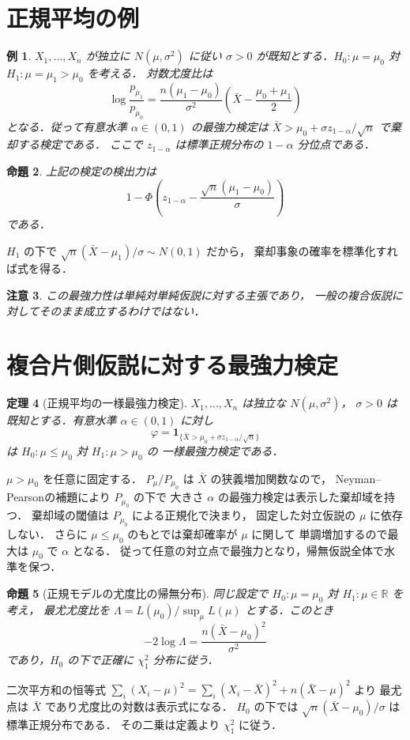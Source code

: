 \documentclass[a5paper,10pt,onecolumn]{jsarticle}
\makeatletter
\theoremstyle{mathnotetheorem}
\newtheorem{theorem}{定理}[section]
\newtheorem{proposition}[theorem]{命題}
\newtheorem{example}[theorem]{例}
\newtheorem{remark}[theorem]{注意}
\renewcommand{\proofname}{証明}
\renewenvironment{proof}[1][\proofname]{%
  \par\pushQED{\qed}\normalfont\topsep4\p@\@plus2\p@\relax
  \trivlist\item[\hskip\labelsep\bfseries #1]\ignorespaces
}{\popQED\endtrivlist\@endpefalse}
\makeatother
\begin{document}
\section{正規平均の例}
\begin{example}
$X_1,\ldots,X_n$ が独立に $N(\mu,\sigma^2)$ に従い
$\sigma>0$ が既知とする．$H_0:\mu=\mu_0$ 対
$H_1:\mu=\mu_1>\mu_0$ を考える．
対数尤度比は
\[
 \log\frac{p_{\mu_1}}{p_{\mu_0}}
 =\frac{n(\mu_1-\mu_0)}{\sigma^2}
  \left(\bar X-\frac{\mu_0+\mu_1}{2}\right)
\]
となる．従って有意水準 $\alpha\in(0,1)$ の最強力検定は
$\bar X>\mu_0+\sigma z_{1-\alpha}/\sqrt n$ で棄却する検定である．
ここで $z_{1-\alpha}$ は標準正規分布の $1-\alpha$ 分位点である．
\end{example}
\begin{proposition}
上記の検定の検出力は
\[
 1-\Phi\!\left(z_{1-\alpha}-\frac{\sqrt n(\mu_1-\mu_0)}{\sigma}\right)
\]
である．
\end{proposition}
\begin{proof}
$H_1$ の下で $\sqrt n(\bar X-\mu_1)/\sigma\sim N(0,1)$ だから，
棄却事象の確率を標準化すれば式を得る．
\end{proof}
\begin{remark}
この最強力性は単純対単純仮説に対する主張であり，
一般の複合仮説に対してそのまま成立するわけではない．
\end{remark}


\section{複合片側仮説に対する最強力検定}
\begin{theorem}[正規平均の一様最強力検定]
$X_1,\ldots,X_n$ は独立な $N(\mu,\sigma^2)$，
$\sigma>0$ は既知とする．有意水準 $\alpha\in(0,1)$ に対し
\[
 \varphi=\mathbf1_{\{\bar X>\mu_0+\sigma z_{1-\alpha}/\sqrt n\}}
\]
は $H_0:\mu\le\mu_0$ 対 $H_1:\mu>\mu_0$ の
一様最強力検定である．
\end{theorem}
\begin{proof}
$\mu>\mu_0$ を任意に固定する．
$P_\mu/P_{\mu_0}$ は $\bar X$ の狭義増加関数なので，
Neyman--Pearsonの補題により $P_{\mu_0}$ の下で
大きさ $\alpha$ の最強力検定は表示した棄却域を持つ．
棄却域の閾値は $P_{\mu_0}$ による正規化で決まり，
固定した対立仮説の $\mu$ に依存しない．
さらに $\mu\le\mu_0$ のもとでは棄却確率が $\mu$ に関して
単調増加するので最大は $\mu_0$ で $\alpha$ となる．
従って任意の対立点で最強力となり，帰無仮説全体で水準を保つ．
\end{proof}
\begin{proposition}[正規モデルの尤度比の帰無分布]
同じ設定で $H_0:\mu=\mu_0$ 対 $H_1:\mu\in\mathbb R$ を考え，
最尤尤度比を $\Lambda=L(\mu_0)/\sup_\mu L(\mu)$ とする．このとき
\[
 -2\log\Lambda=\frac{n(\bar X-\mu_0)^2}{\sigma^2}
\]
であり，$H_0$ の下で正確に $\chi^2_1$ 分布に従う．
\end{proposition}
\begin{proof}
二次平方和の恒等式
$\sum_i(X_i-\mu)^2=\sum_i(X_i-\bar X)^2+n(\bar X-\mu)^2$ より
最尤点は $\bar X$ であり尤度比の対数は表示式になる．
$H_0$ の下では $\sqrt n(\bar X-\mu_0)/\sigma$ は標準正規分布である．
その二乗は定義より $\chi^2_1$ に従う．
\end{proof}
\end{document}
